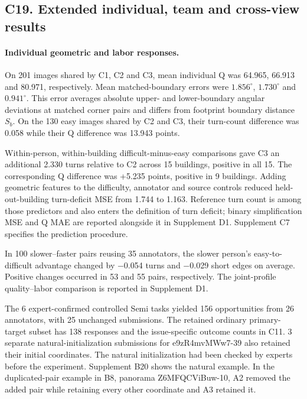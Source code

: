 \subsection*{C19. Extended individual, team and cross-view results}

\paragraph{Individual geometric and labor responses.}
On 201 images shared by C1, C2 and C3, mean individual Q was 64.965, 66.913 and 80.971, respectively. Mean matched-boundary errors were $1.856^\circ$, $1.730^\circ$ and $0.941^\circ$. This error averages absolute upper- and lower-boundary angular deviations at matched corner pairs and differs from footprint boundary distance $S_b$. On the 130 easy images shared by C2 and C3, their turn-count difference was 0.058 while their Q difference was 13.943 points.

Within-person, within-building difficult-minus-easy comparisons gave C3 an additional 2.330 turns relative to C2 across 15 buildings, positive in all 15. The corresponding Q difference was +5.235 points, positive in 9 buildings. Adding geometric features to the difficulty, annotator and source controls reduced held-out-building turn-deficit MSE from 1.744 to 1.163. Reference turn count is among those predictors and also enters the definition of turn deficit; binary simplification MSE and Q MAE are reported alongside it in Supplement D1. Supplement C7 specifies the prediction procedure.

In 100 slower--faster pairs reusing 35 annotators, the slower person's easy-to-difficult advantage changed by $-$0.054 turns and $-$0.029 short edges on average. Positive changes occurred in 53 and 55 pairs, respectively. The joint-profile quality--labor comparison is reported in Supplement D1.

The 6 expert-confirmed controlled Semi tasks yielded 156 opportunities from 26 annotators, with 25 unchanged submissions. The retained ordinary primary-target subset has 138 responses and the issue-specific outcome counts in C11. 3 separate natural-initialization submissions for e9zR4mvMWw7-39 also retained their initial coordinates. The natural initialization had been checked by experts before the experiment. Supplement B20 shows the natural example. In the duplicated-pair example in B8, panorama Z6MFQCViBuw-10, A2 removed the added pair while retaining every other coordinate and A3 retained it.

